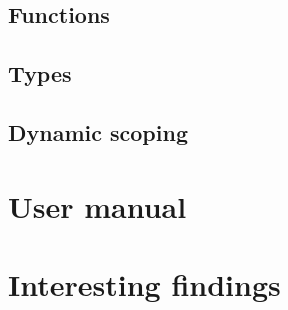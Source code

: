 \documentclass[11pt]{article}
\begin{document}
	\subsection{Functions}
	\subsection{Types}
	\subsection{Dynamic scoping}

\section{User manual}

\section{Interesting findings}
\end{document}
